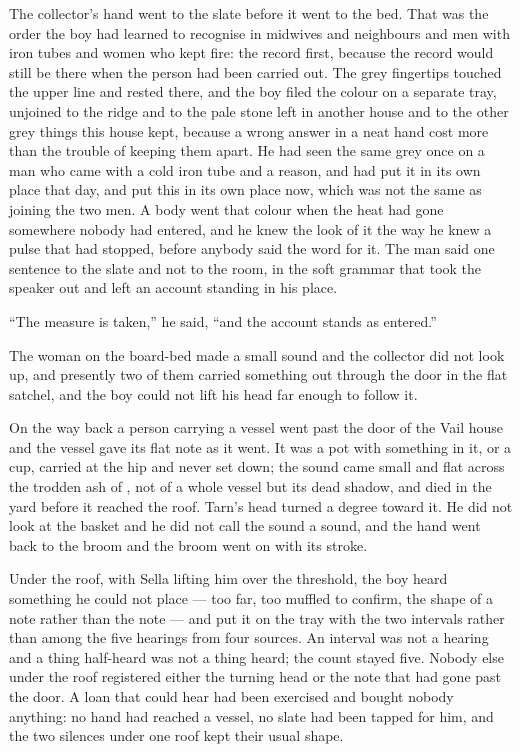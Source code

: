 The collector's hand went to the slate before it went to the bed. That was the order the boy had learned to recognise in midwives and neighbours and men with iron tubes and women who kept fire: the record first, because the record would still be there when the person had been carried out. The grey fingertips touched the upper line and rested there, and the boy filed the colour on a separate tray, unjoined to the ridge and to the pale stone left in another house and to the other grey things this house kept, because a wrong answer in a neat hand cost more than the trouble of keeping them apart. He had seen the same grey once on a man who came with a cold iron tube and a reason, and had put it in its own place that day, and put this in its own place now, which was not the same as joining the two men. A body went that colour when the heat had gone somewhere nobody had entered, and he knew the look of it the way he knew a pulse that had stopped, before anybody said the word for it. The man said one sentence to the slate and not to the room, in the soft grammar that took the speaker out and left an account standing in his place.

“The measure is taken,” he said, “and the account stands as entered.”

The woman on the board-bed made a small sound and the collector did not look up, and presently two of them carried something out through the door in the flat satchel, and the boy could not lift his head far enough to follow it.

On the way back a person carrying a vessel went past the door of the Vail house and the vessel gave its flat note as it went. It was a pot with something in it, or a cup, carried at the hip and never set down; the sound came small and flat across the trodden ash of , not  of a whole vessel but its dead shadow, and died in the yard before it reached the roof. Tarn's head turned a degree toward it. He did not look at the basket and he did not call the sound a sound, and the hand went back to the broom and the broom went on with its stroke.

Under the roof, with Sella lifting him over the threshold, the boy heard something he could not place --- too far, too muffled to confirm, the shape of a note rather than the note --- and put it on the tray with the two intervals rather than among the five hearings from four sources. An interval was not a hearing and a thing half-heard was not a thing heard; the count stayed five. Nobody else under the roof registered either the turning head or the note that had gone past the door. A loan that could hear had been exercised and bought nobody anything: no hand had reached a vessel, no slate had been tapped for him, and the two silences under one roof kept their usual shape.

